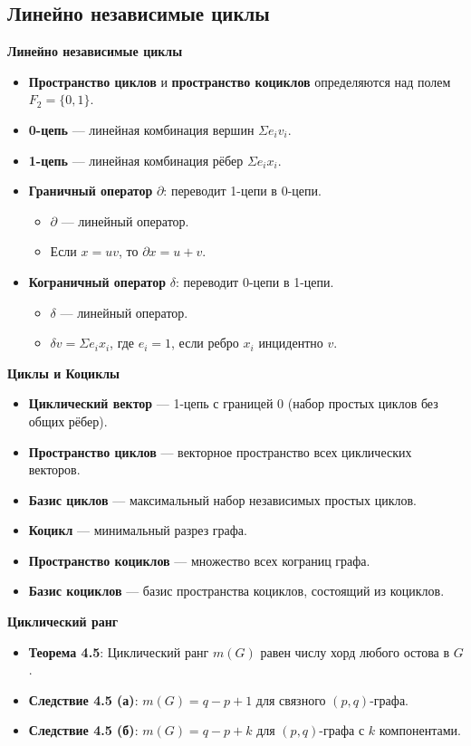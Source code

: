 \subsection{Линейно независимые циклы}
\textbf{Линейно независимые циклы}
\begin{itemize}
    \item \textbf{Пространство циклов} и \textbf{пространство коциклов} определяются над полем $F_2 = \{0, 1\}$.
    \item \textbf{0-цепь} — линейная комбинация вершин $\Sigma e_i v_i$.
    \item \textbf{1-цепь} — линейная комбинация рёбер $\Sigma e_i x_i$.
    \item \textbf{Граничный оператор} $\partial$: переводит 1-цепи в 0-цепи.
    \begin{itemize}
        \item $\partial$ — линейный оператор.
        \item Если $x = uv$, то $\partial x = u + v$.
    \end{itemize}
    \item \textbf{Кограничный оператор} $\delta$: переводит 0-цепи в 1-цепи.
    \begin{itemize}
        \item $\delta$ — линейный оператор.
        \item $\delta v = \Sigma e_i x_i$, где $e_i = 1$, если ребро $x_i$ инцидентно $v$.
    \end{itemize}
\end{itemize}

\textbf{Циклы и Коциклы}
\begin{itemize}
    \item \textbf{Циклический вектор} — 1-цепь с границей 0 (набор простых циклов без общих рёбер).
    \item \textbf{Пространство циклов} — векторное пространство всех циклических векторов.
    \item \textbf{Базис циклов} — максимальный набор независимых простых циклов.
    \item \textbf{Коцикл} — минимальный разрез графа.
    \item \textbf{Пространство коциклов} — множество всех кограниц графа.
    \item \textbf{Базис коциклов} — базис пространства коциклов, состоящий из коциклов.
\end{itemize}

\textbf{Циклический ранг}
\begin{itemize}
    \item \textbf{Теорема 4.5}: Циклический ранг $m(G)$ равен числу хорд любого остова в $G$.
    \item \textbf{Следствие 4.5 (а)}: $m(G) = q - p + 1$ для связного $(p, q)$-графа.
    \item \textbf{Следствие 4.5 (б)}: $m(G) = q - p + k$ для $(p, q)$-графа с $k$ компонентами.
\end{itemize}


